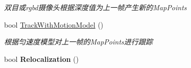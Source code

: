 \begin{DoxyCompactItemize}
\begin{DoxyCompactList}\small\item\em 双目或rgbd摄像头根据深度值为上一帧产生新的\-Map\-Points \end{DoxyCompactList}\item 
bool \hyperlink{classORB__SLAM2_1_1Tracking_aca19f1d69b30a6c6e49281d422ac8298}{Track\-With\-Motion\-Model} ()
\begin{DoxyCompactList}\small\item\em 根据匀速度模型对上一帧的\-Map\-Points进行跟踪 \end{DoxyCompactList}\item 
\hypertarget{classORB__SLAM2_1_1Tracking_acd4ea9e7097bed16428a4b78fe4b6a67}{bool {\bfseries Relocalization} ()}\label{classORB__SLAM2_1_1Tracking_acd4ea9e7097bed16428a4b78fe4b6a67}


\end{DoxyCompactItemize}
